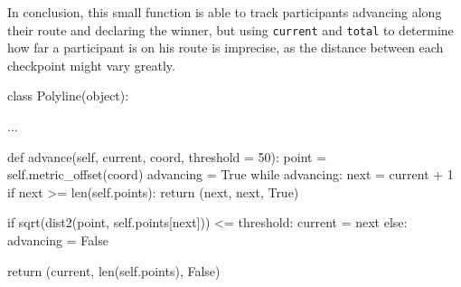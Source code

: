 In conclusion, this small function is able to track participants advancing along their route and declaring the winner, but using \texttt{current} and \texttt{total} to determine how far a participant is on his route is imprecise, as the distance between each checkpoint might vary greatly.

\begin{code}[label={lst:sprint4-polyline}, caption={The Advance Function of Polyline}, language={Python}]
class Polyline(object):

	...

	def advance(self, current, coord, threshold = 50):
		point = self.metric_offset(coord)
		advancing = True
		while advancing:
			next = current + 1
			if next >= len(self.points):
				return (next, next, True)

			if sqrt(dist2(point, self.points[next])) <= threshold:
				current = next
			else:
				advancing = False

		return (current, len(self.points), False)
\end{code}
